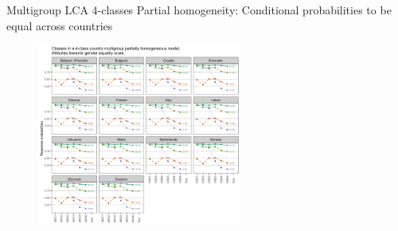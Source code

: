\documentclass[11pt,t]{beamer}
\begin{document}
\begin{frame}{Multigroup LCA 4-classes}
\vspace{-3.1mm} 
Partial homogeneity: Conditional probabilities to be equal across countries
\vspace{-3.1mm} 
\begin{figure}
	\centering
	\includegraphics[width=0.6\textwidth]{graphics/MGPHOMgender.png}
\end{figure}
\end{frame} 


	
\end{document}
